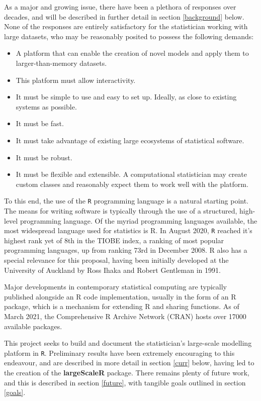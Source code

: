 As a major and growing issue, there have been a plethora of responses over decades, and will be described in further detail in section \ref{background} below.
None of the responses are entirely satisfactory for the statistician working with large datasets, who may be reasonably posited to possess the following demands:

\begin{itemize}
        \item A platform that can enable the creation of novel models and apply them to larger-than-memory datasets.
        \item This platform must allow interactivity.
        \item It must be simple to use and easy to set up.
                Ideally, as close to existing systems as possible.
        \item It must be fast.
        \item It must take advantage of existing large ecosystems of statistical software.
        \item It must be robust.
        \item It must be flexible and extensible.
                A computational statistician may create custom classes and reasonably expect them to work well with the platform.
\end{itemize}

To this end, the use of the \texttt{R} programming language is a natural starting point.
The means for writing software is typically through the use of a structured, high-level programming language.
Of the myriad programming languages available, the most widespread language used for statistics is R.
In August 2020, \texttt{R} reached it's highest rank yet of 8th in the TIOBE index, a ranking of most popular programming languages, up from ranking 73rd in December 2008\cite{tiobe2021r}.
R also has a special relevance for this proposal, having been initially developed at the University of Auckland by Ross Ihaka and Robert Gentleman in 1991\cite{ihaka1996r}.

Major developments in contemporary statistical computing are typically published alongside an R code implementation, usually in the form of an R package, which is a mechanism for extending R and sharing functions.
As of March 2021, the Comprehensive R Archive Network (CRAN) hosts over 17000 available packages\cite{team20:_r}.

This project seeks to build and document the statistician's large-scale modelling platform in \texttt{R}.
Preliminary results have been extremely encouraging to this endeavour, and are described in more detail in section \ref{curr} below, having led to the creation of the \textbf{largeScaleR} package\cite{cairns2020largescaler}.
There remains plenty of future work, and this is described in section \ref{future}, with tangible goals outlined in section \ref{goals}.


